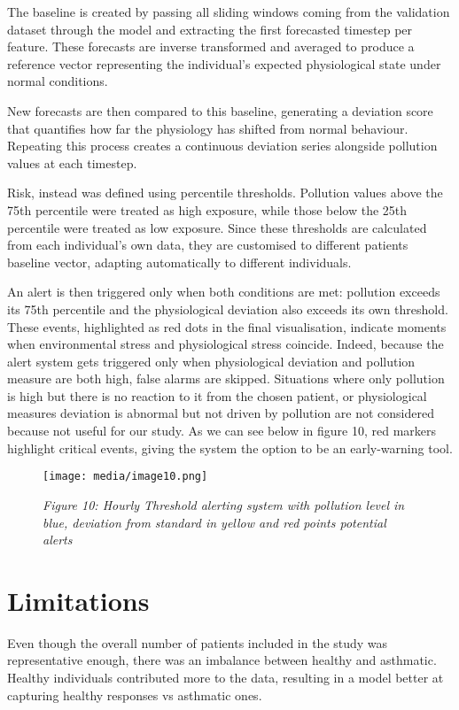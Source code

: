 \documentclass[12pt,a4paper]{report}
\begin{document}
The baseline is created by passing all sliding windows coming from the
validation dataset through the model and extracting the first forecasted
timestep per feature. These forecasts are inverse transformed and
averaged to produce a reference vector representing the individual's
expected physiological state under normal conditions.

New forecasts are then compared to this baseline, generating a deviation
score that quantifies how far the physiology has shifted from normal
behaviour. Repeating this process creates a continuous deviation series
alongside pollution values at each timestep.

Risk, instead was defined using percentile thresholds. Pollution values above the
75th percentile were treated as high exposure, while those below the
25th percentile were treated as low exposure. Since these thresholds are
calculated from each individual's own data, they are customised to
different patients baseline vector, adapting automatically to different
individuals.

An alert is then triggered only when both conditions are met: pollution
exceeds its 75th percentile and the physiological deviation also exceeds
its own threshold. These events, highlighted as red dots in the final
visualisation, indicate moments when environmental stress and
physiological stress coincide. Indeed, because the alert system gets
triggered only when physiological deviation and pollution measure are
both high, false alarms are skipped. Situations where only pollution is
high but there is no reaction to it from the chosen patient, or
physiological measures deviation is abnormal but not driven by pollution
are not considered because not useful for our study. As we can see below
in figure 10, red markers highlight critical events, giving the system
the option to be an early-warning tool.


\begin{figure}[h!]
    \centering
    \texttt{[image: media/image10.png]}
    \caption*{\emph{Figure 10: Hourly Threshold alerting system with pollution level
in blue, deviation from standard in yellow and red points potential
alerts}}

\end{figure}




\chapter{Limitations}
Even though the overall number of patients included in the study was
representative enough, there was an imbalance between healthy and asthmatic. Healthy individuals contributed more to the data, resulting in a model better at capturing healthy responses vs asthmatic ones. 
\end{document}
